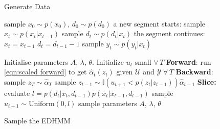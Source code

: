 \begin{figure*}[ttt!]
\begin{minipage}[t]{2in}
\begin{algorithm}[H]
    \caption{Generate Data}
    \label{alg:gen}
    \begin{algorithmic}
        \STATE sample $x_0 \sim p(x_0)$, $d_0 \sim p(d_0)$
                \STATE a new segment starts:
                \STATE sample $x_t \sim p(x_t | x_{t-1})$
                \STATE sample $d_t \sim p(d_t | x_t)$
            \ELSE
                \STATE the segment continues:
                \STATE $x_t = x_{t-1}$
                \STATE $d_t = d_{t-1} - 1$
            \ENDIF
        \STATE sample $y_t \sim p(y_t | x_t)$
        \ENDFOR
    \end{algorithmic}
\end{algorithm} 
 \end{minipage}
 \hfill
 \begin{minipage}[t]{3.3in}
\begin{algorithm}[H]
    \caption{Sample the EDHMM}
    \label{alg:beam}
    \begin{algorithmic}
\STATE Initialise parameters $A$, $\lambda$, $\theta.$ Initialize $u_t$ small $\forall\, T$
    \STATE \textbf{Forward}: run \eqref{eqn:scaled forward} to get $\hat{\alpha}_t(z_t)$ given $\mathcal{U}$ and $\mathcal{Y} \; \forall\, T$
    \STATE \textbf{Backward}: sample $z_T \sim \hat{\alpha}_T$
        \STATE sample $z_{t-1} \sim \mathbb{I}(u_{t+1} < p(z_{t} | z_{t-1}))\hat{\alpha}_{t-1}$
    \ENDFOR
\STATE \textbf{Slice:}
    \STATE evaluate $l = p(d_t|x_t,d_{t-1})p(x_t|x_{t-1},d_{t-1})$
    \STATE sample $u_{t+1} \sim \mathrm{Uniform}(0,l)$
    \ENDFOR
\STATE sample parameters $A$, $\lambda$, $\theta$
\ENDFOR
\end{algorithmic}
\end{algorithm}
\end{minipage}
 \hfill
\end{figure*}